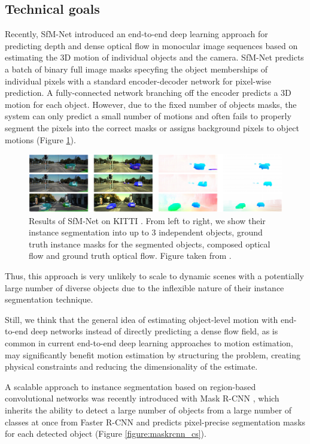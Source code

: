 \subsection{Technical goals}

Recently, SfM-Net \cite{SfmNet} introduced an end-to-end deep learning approach for predicting depth
and dense optical flow in monocular image sequences based on estimating the 3D motion of individual objects and the camera.
SfM-Net predicts a batch of binary full image masks specyfing the object memberships of individual pixels with a standard encoder-decoder
network for pixel-wise prediction. A fully-connected network branching off the encoder predicts a 3D motion for each object.
However, due to the fixed number of objects masks, the system can only predict a small number of motions and
often fails to properly segment the pixels into the correct masks or assigns background pixels to object motions (Figure \ref{figure:sfmnet_kitti}).
\begin{figure}[t]
  \centering
  \includegraphics[width=\textwidth]{figures/sfmnet_kitti}
\caption{
Results of SfM-Net \cite{SfmNet} on KITTI \cite{KITTI2015}.
From left to right, we show their instance segmentation into up to 3 independent objects,
ground truth instance masks for the segmented objects, composed optical flow and ground truth optical flow.
Figure taken from \cite{SfmNet}.
}
\label{figure:sfmnet_kitti}
\end{figure}
Thus, this approach is very unlikely to scale to dynamic scenes with a potentially
large number of diverse objects due to the inflexible nature of their instance segmentation technique.

Still, we think that the general idea of estimating object-level motion with
end-to-end deep networks instead
of directly predicting a dense flow field, as is common in current end-to-end
deep learning approaches to motion estimation, may significantly benefit motion
estimation by structuring the problem, creating physical constraints and reducing
the dimensionality of the estimate.

A scalable approach to instance segmentation based on region-based convolutional networks
was recently introduced with Mask R-CNN \cite{MaskRCNN}, which inherits the ability to detect
a large number of objects from a large number of classes at once from Faster R-CNN
and predicts pixel-precise segmentation masks for each detected object (Figure \ref{figure:maskrcnn_cs}).


